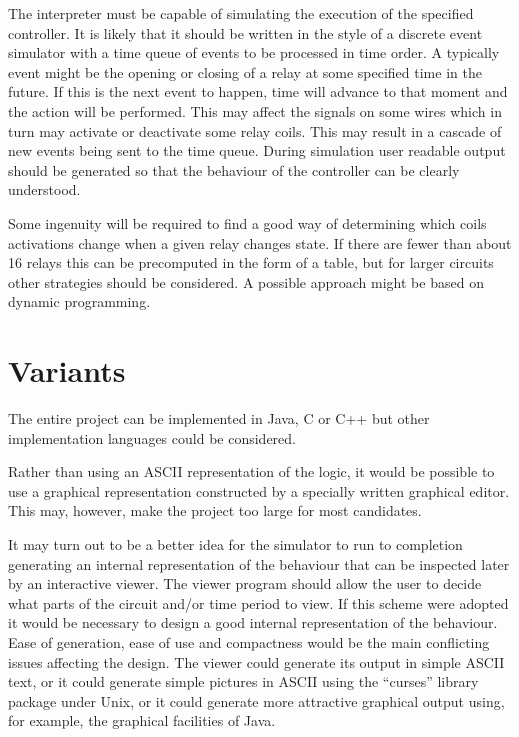\documentclass[12pt]{article}
\begin{document}
The interpreter must be capable of simulating the execution of the
specified controller.  It is likely that it should be written in the
style of a discrete event simulator with a time queue of events to be
processed in time order. A typically event might be the opening or
closing of a relay at some specified time in the future. If this is
the next event to happen, time will advance to that moment and the
action will be performed.  This may affect the signals on some wires
which in turn may activate or deactivate some relay coils. This may
result in a cascade of new events being sent to the time queue. During
simulation user readable output should be generated so that the
behaviour of the controller can be clearly understood.

Some ingenuity will be required to find a good way of determining
which coils activations change when a given relay changes state.  If
there are fewer than about 16 relays this can be precomputed in the
form of a table, but for larger circuits other strategies should be
considered. A possible approach might be based on dynamic programming.


\section*{Variants}

The entire project can be implemented in Java, C or C++ but other
implementation languages could be considered.

Rather than using an ASCII representation of the logic, it would be
possible to use a graphical representation constructed by a specially
written graphical editor. This may, however, make the project
too large for most candidates.

It may turn out to be a better idea for the simulator to run to
completion generating an internal representation of the behaviour that
can be inspected later by an interactive viewer. The viewer program
should allow the user to decide what parts of the circuit and/or time
period to view.  If this scheme were adopted it would be necessary to
design a good internal representation of the behaviour. Ease of
generation, ease of use and compactness would be the main conflicting
issues affecting the design.  The viewer could generate its output in
simple ASCII text, or it could generate simple pictures in ASCII using
the ``curses'' library package under Unix, or it could generate more
attractive graphical output using, for example, the graphical
facilities of Java.
\end{document}
